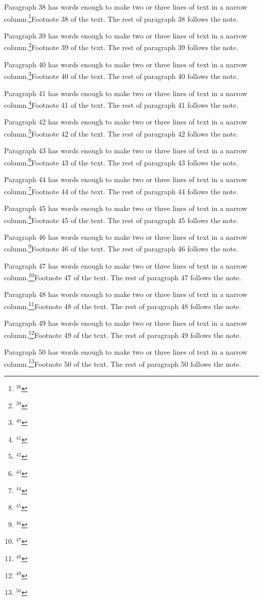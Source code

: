 Paragraph 38 has words enough to make two or three lines of text in a narrow column.\footnote{$^{38}$}{Footnote 38 of the text.} The rest of paragraph 38 follows the note.\par
Paragraph 39 has words enough to make two or three lines of text in a narrow column.\footnote{$^{39}$}{Footnote 39 of the text.} The rest of paragraph 39 follows the note.\par
Paragraph 40 has words enough to make two or three lines of text in a narrow column.\footnote{$^{40}$}{Footnote 40 of the text.} The rest of paragraph 40 follows the note.\par
Paragraph 41 has words enough to make two or three lines of text in a narrow column.\footnote{$^{41}$}{Footnote 41 of the text.} The rest of paragraph 41 follows the note.\par
Paragraph 42 has words enough to make two or three lines of text in a narrow column.\footnote{$^{42}$}{Footnote 42 of the text.} The rest of paragraph 42 follows the note.\par
Paragraph 43 has words enough to make two or three lines of text in a narrow column.\footnote{$^{43}$}{Footnote 43 of the text.} The rest of paragraph 43 follows the note.\par
Paragraph 44 has words enough to make two or three lines of text in a narrow column.\footnote{$^{44}$}{Footnote 44 of the text.} The rest of paragraph 44 follows the note.\par
Paragraph 45 has words enough to make two or three lines of text in a narrow column.\footnote{$^{45}$}{Footnote 45 of the text.} The rest of paragraph 45 follows the note.\par
Paragraph 46 has words enough to make two or three lines of text in a narrow column.\footnote{$^{46}$}{Footnote 46 of the text.} The rest of paragraph 46 follows the note.\par
Paragraph 47 has words enough to make two or three lines of text in a narrow column.\footnote{$^{47}$}{Footnote 47 of the text.} The rest of paragraph 47 follows the note.\par
Paragraph 48 has words enough to make two or three lines of text in a narrow column.\footnote{$^{48}$}{Footnote 48 of the text.} The rest of paragraph 48 follows the note.\par
Paragraph 49 has words enough to make two or three lines of text in a narrow column.\footnote{$^{49}$}{Footnote 49 of the text.} The rest of paragraph 49 follows the note.\par
Paragraph 50 has words enough to make two or three lines of text in a narrow column.\footnote{$^{50}$}{Footnote 50 of the text.} The rest of paragraph 50 follows the note.\par
